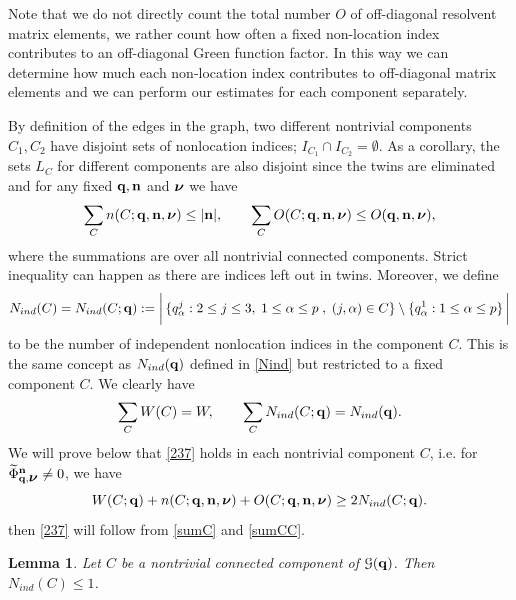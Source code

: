 \documentclass[draft]{article}
\newcommand{\wt}{\widetilde}
\newcommand{\bq}{{\bf {q}}}
\newcommand{\bn}{{\bf{n}}}
\newcommand{\bnu}{\mbox{\boldmath $\nu$}}
\newcommand{\al}{\alpha}
\newcommand{\be}{\begin{equation}}
\newcommand{\ee}{\end{equation}}
\newtheorem{lemma}[theorem]{Lemma}
\numberwithin{equation}{section}
\numberwithin{theorem}{section}
\numberwithin{definition}{section}
\numberwithin{remark}{section}
\begin{document}
Note that we do not directly count the total 
number $O$ of off-diagonal resolvent matrix elements, 
we rather count how often a fixed non-location index contributes
to an off-diagonal Green function factor. 
In this way we can determine how much each non-location index
contributes to off-diagonal matrix elements and we
can perform our estimates for each component separately.




By definition of the edges in the graph,
 two different nontrivial components $C_1, C_2$ have disjoint 
sets of nonlocation indices; $I_{C_1}\cap I_{C_2}=\emptyset$. 
As a corollary,  the sets $L_C$ for different components are
 also disjoint since the twins are eliminated and for any fixed $\bq, \bn$ and $\bnu$ we have
\be
   \sum_C n(C; \bq,\bn,\bnu) \le |\bn| , \qquad \sum_C O(C; \bq,\bn,\bnu)\le
  O(\bq,\bn,\bnu),
\label{sumC}
\ee
where the summations are over all nontrivial connected components.
Strict inequality can happen as there are indices left out in twins.  
Moreover, we define 
$$
   N_{ind}(C) = N_{ind}(C;\bq):=
\bigg | \, \{ q^j_\alpha: 2 \le j \le 3, \;  1 \le \alpha \le p\; , \; 
(j,\al)\in C \}
 \setminus  \{ q^1_\alpha:  1 \le \alpha \le p \} \, \bigg | 
$$
to be the number of independent  nonlocation indices in the component $C$.
This is the same concept as $N_{ind}(\bq)$ defined in \eqref{Nind} but
restricted to a fixed component $C$.
We clearly have
\be
    \sum_C W(C) = W, \qquad \sum_C N_{ind} (C ; \bq) = N_{ind}(\bq).
\label{sumCC}
\ee
We will prove below that \eqref{237} holds in each nontrivial component $C$, i.e.
for $\wt\Phi_{\bq,\bnu}^{\bf n}\ne 0$, we have
\be\label{2371}
W (C;\bq) +  n(C; \bq,\bn,\bnu)  +   
 O (C; \bq, \bn, \bnu) \ge  2   N_{ind}(C;\bq).
\ee
then \eqref{237} will follow from  \eqref{sumC} and \eqref{sumCC}.

\bigskip


\begin{lemma} \label{lemma:Nleq1}
 Let $C$ be a nontrivial connected component
 of ${\cal G}(\bq)$. Then $N_{ind}(C) \le 1$.
\end{lemma}
\end{document}
